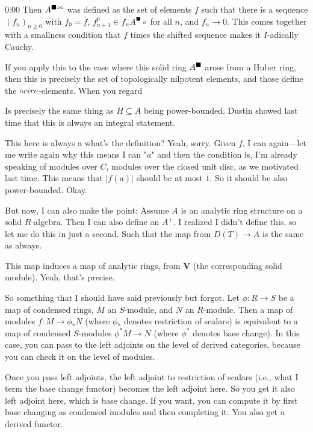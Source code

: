 \begin{unfinished}{0:00}
Then $A^{\blacksquare\circ\circ}$ was defined as the set of elements $f$ such that there is a sequence $(f_n)_{n \geq 0}$ with $f_0 = f$, $f_{n+1}^p \in f_n A^\blacksquare \circ$ for all $n$, and $f_n \to 0$. This comes together with a smallness condition that $f$ times the shifted sequence makes it $I$-adically Cauchy.

If you apply this to the case where this solid ring $A^\blacksquare$ arose from a Huber ring, then this is precisely the set of topologically nilpotent elements, and those define the $\circ\\circ$-elements. When you regard 

Is precisely the same thing as $H \subseteq A$ being power-bounded. Dustin showed last time that this is always an integral statement.

This here is always a what's the definition? Yeah, sorry. Given $f$, I can again---let me write again why this means I can "$a$" and then the condition is, I'm already speaking of modules over $C$, modules over the closed unit disc, as we motivated last time. This means that $\lvert f(a) \rvert$ should be at most $1$. So it should be also power-bounded. Okay.

But now, I can also make the point: Assume $A$ is an analytic ring structure on a solid $R$-algebra. Then I can also define an $A^+$. I realized I didn't define this, so let me do this in just a second. Such that the map from $D(T) \to A$ is the same as always.

This map induces a map of analytic rings, from $\mathbf{V}$ (the corresponding solid module). Yeah, that's precise.

So something that I should have said previously but forgot. Let $\phi\colon R \to S$ be a map of condensed rings, $M$ an $S$-module, and $N$ an $R$-module. Then a map of modules $f\colon M \to \phi_* N$ (where $\phi_*$ denotes restriction of scalars) is equivalent to a map of condensed $S$-modules $\phi^* M \to N$ (where $\phi^*$ denotes base change). In this case, you can pass to the left adjoints on the level of derived categories, because you can check it on the level of modules.

Once you pass left adjoints, the left adjoint to restriction of scalars (i.e., what I term the base change functor) becomes the left adjoint here. So you get it also left adjoint here, which is base change. If you want, you can compute it by first base changing as condensed modules and then completing it. You also get a derived functor.


\end{unfinished}
